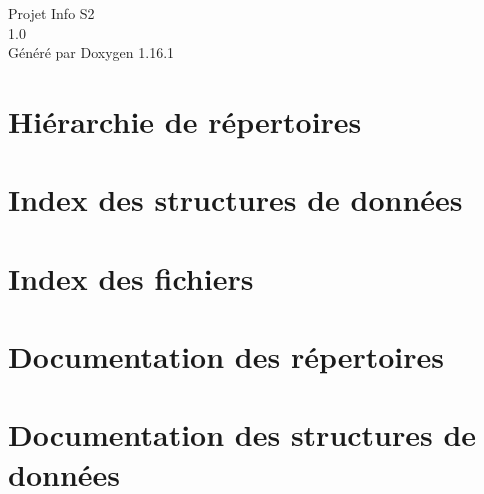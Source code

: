 \documentclass[twoside]{book}
\newcommand{\+}{\discretionary{\mbox{\scriptsize$\hookleftarrow$}}{}{}}
\newcommand{\clearemptydoublepage}{%
    \newpage{\pagestyle{empty}\cleardoublepage}%
  }
\begin{document}
  \raggedbottom
    \hypersetup{pageanchor=false,
                bookmarksnumbered=true,
                pdfencoding=unicode
               }
  \begin{titlepage}
  \vspace*{7cm}
  \begin{center}%
  {\Large Projet Info S2}\\
  [1ex]\large 1.\+0 \\
  \vspace*{1cm}
  {\large Généré par Doxygen 1.16.1}\\
  \end{center}
  \end{titlepage}
  \clearemptydoublepage
  \tableofcontents
  \clearemptydoublepage
  \hypersetup{pageanchor=true}

\chapter{Hiérarchie de répertoires}

\chapter{Index des structures de données}

\chapter{Index des fichiers}

\chapter{Documentation des répertoires}






\chapter{Documentation des structures de données}










\end{document}
